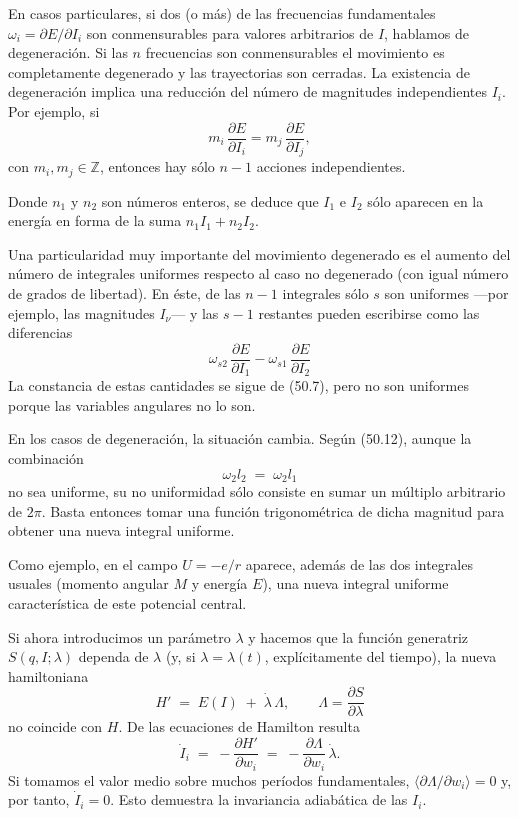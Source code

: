 \documentclass[12pt]{article}
\begin{document}
En casos particulares, si dos (o más) de las frecuencias fundamentales
\(\omega_i=\partial E/\partial I_i\)
son conmensurables para valores arbitrarios de \(I\), hablamos de degeneración. Si las \(n\) frecuencias son conmensurables el movimiento es completamente degenerado y las trayectorias son cerradas. La existencia de degeneración implica una reducción del número de magnitudes independientes \(I_i\). Por ejemplo, si
\[
m_i\,\frac{\partial E}{\partial I_i}
  = m_j\,\frac{\partial E}{\partial I_j},
\tag{50.12}
\]
con \(m_i,m_j\in\mathbb{Z}\), entonces hay sólo \(n-1\) acciones independientes.

Donde \(n_1\) y \(n_2\) son números enteros, se deduce que \(I_1\) e \(I_2\) sólo aparecen en la energía en forma de la suma \(n_1I_1 + n_2I_2\).

Una particularidad muy importante del movimiento degenerado es el aumento del número de integrales uniformes respecto al caso no degenerado (con igual número de grados de libertad). En éste, de las \(n-1\) integrales sólo \(s\) son uniformes —por ejemplo, las magnitudes \(I_\nu\)— y las \(s-1\) restantes pueden escribirse como las diferencias
\[
\omega_{s2}\,\frac{\partial E}{\partial I_1}
- \omega_{s1}\,\frac{\partial E}{\partial I_2}
\tag{50.13}
\]
La constancia de estas cantidades se sigue de (50.7), pero no son uniformes porque las variables angulares no lo son.

En los casos de degeneración, la situación cambia. Según (50.12), aunque la combinación
\[
\omega_{2}l_2 \;=\;\omega_{2}l_1
\tag{50.14}
\]
no sea uniforme, su no uniformidad sólo consiste en sumar un múltiplo arbitrario de \(2\pi\). Basta entonces tomar una función trigonométrica de dicha magnitud para obtener una nueva integral uniforme.

Como ejemplo, en el campo \(U=-e/r\) aparece, además de las dos integrales usuales (momento angular \(M\) y energía \(E\)), una nueva integral uniforme característica de este potencial central.

Si ahora introducimos un parámetro \(\lambda\) y hacemos que la función generatriz \(S(q,I;\lambda)\) dependa de \(\lambda\) (y, si \(\lambda=\lambda(t)\), explícitamente del tiempo), la nueva hamiltoniana
\[
H' \;=\;E(I)\;+\;\dot\lambda\,\Lambda,
\qquad
\Lambda = \frac{\partial S}{\partial \lambda}
\]
no coincide con \(H\). De las ecuaciones de Hamilton resulta
\[
\dot I_i \;=\; -\frac{\partial H'}{\partial w_i}
\;=\; -\frac{\partial\Lambda}{\partial w_i}\,\dot\lambda.
\tag{50.15}
\]
Si tomamos el valor medio sobre muchos períodos fundamentales, \(\langle\partial\Lambda/\partial w_i\rangle=0\) y, por tanto, \(\dot I_i=0\). Esto demuestra la invariancia adiabática de las \(I_i\).
\end{document}
